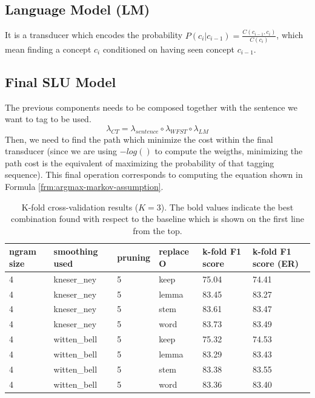 \documentclass[11pt,a4paper]{article}
\begin{document}
\subsection{Language Model (LM)}
It is a transducer which encodes the probability $P(c_i|c_{i-1}) = \frac{C(c_{i-1}, c_i)}{C(c_i)}$, which mean finding a concept $c_i$ conditioned on having seen concept $c_{i-1}$. 

\subsection{Final SLU Model}

The previous components needs to be composed together with the sentence we want to tag to be used.
\begin{equation}
\lambda_{CT} = \lambda_{sentence} \circ \lambda_{WFST} \circ \lambda_{LM}
\end{equation}
Then, we need to find the path which minimize the cost within the final transducer (since we are using $-log()$ to compute the weigths, minimizing the path cost is the equivalent of maximizing the probability of that tagging sequence). This final operation corresponds to computing the equation shown in Formula \ref{frm:argmax-markov-assumption}.

\begin{table}[th!]
\centering
\caption{K-fold cross-validation results ($K=3$). The bold values indicate the best combination found with respect to the baseline which is shown on the first line from the top.}
\label{tab:eval-resuts}
\begin{tabular}{llllll}
\hline
\textbf{ngram size} & \textbf{smoothing used} & \textbf{pruning} & \textbf{replace O} & \textbf{k-fold F1 score} & \textbf{k-fold F1 score (ER)} \\ \hline
4 & kneser\_ney & 5 & keep & 75.04 & 74.41 \\
4 & kneser\_ney & 5 & lemma & 83.45 & 83.27 \\
4 & kneser\_ney & 5 & stem & 83.61 & 83.47 \\
4 & kneser\_ney & 5 & word & 83.73 & 83.49 \\
4 & witten\_bell & 5 & keep & 75.32 & 74.53 \\
4 & witten\_bell & 5 & lemma & 83.29 & 83.43 \\
4 & witten\_bell & 5 & stem & 83.38 & 83.55 \\
4 & witten\_bell & 5 & word & 83.36 & 83.40 \\ \hline
\end{tabular}
\end{table}
\end{document}
